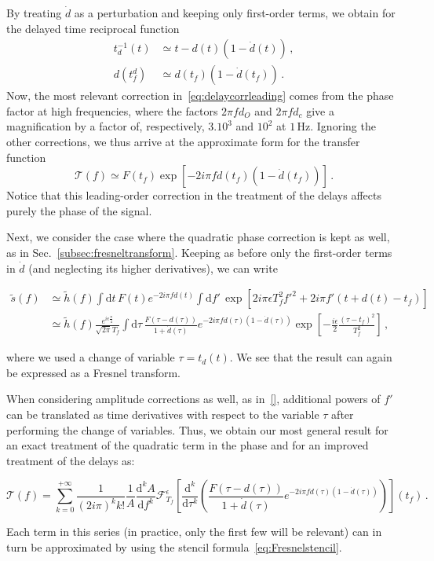 \documentclass[aps,showpacs,twocolumn,
prd,superscriptaddress,nofootinbib]{revtex4-1}
\newcommand{\be}{\begin{equation}}
\newcommand{\ee}{\end{equation}}
\newcommand\ud{{\mathrm{d}}}
\newcommand\calF{{\mathcal{F}}}
\newcommand\calT{{\mathcal{T}}}
\newcommand{\nn}{\nonumber}
\newcommand{\Hz}{\,\mathrm{Hz}}
\newcommand{\tf}{t_{f}}
\newcommand{\Tf}{T_{f}}
\begin{document}
By treating $\dot{d}$ as a perturbation and keeping only first-order terms, we obtain for the delayed time reciprocal function
\begin{align}
	t_{d}^{-1}(t) &\simeq t-d(t) (1-\dot{d}(t)) \,,\nn\\
	d(t_{f}^{d}) &\simeq d(t_{f}) ( 1 - \dot{d}(t_{f})) \,.
\end{align}
Now, the most relevant correction in~\eqref{eq:delaycorrleading} comes from the phase factor at high frequencies, where the factors $2\pi f d_{O}$ and $2\pi f d_{c}$ give a magnification by a factor of, respectively, $3.10^{3}$ and $10^{2}$ at $1\Hz$. Ignoring the other corrections, we thus arrive at the approximate form for the transfer function
\be
	\calT(f) \simeq F(t_{f})\exp\left[ -2i\pi f d(t_{f}) (1-\dot{d}(t_{f})) \right] \,.
\ee
Notice that this leading-order correction in the treatment of the delays affects purely the phase of the signal.

Next, we consider the case where the quadratic phase correction is kept as well, as in Sec.~\ref{subsec:fresneltransform}. Keeping as before only the first-order terms in $\dot{d}$ (and neglecting its higher derivatives), we can write
\begin{widetext}
\begin{align}
	\tilde{s}(f) &\simeq \tilde{h}(f) \int \ud t \, F(t) e^{-2i\pi f d(t)} \int \ud f' \, \exp\left[ 2i\pi \epsilon \Tf^{2} f'^{2} + 2i\pi f' (t+d(t) - \tf) \right] \nn\\
	&\simeq \tilde{h}(f) \frac{e^{i\epsilon\frac{\pi}{4}}}{\sqrt{2\pi}\Tf} \int \ud \tau \, \frac{F(\tau - d(\tau))}{1+\dot{d}(\tau)} e^{-2i\pi f d(\tau)(1-\dot{d}(\tau))}\exp\left[ -\frac{i\epsilon}{2} \frac{(\tau - \tf)^{2}}{\Tf^{2}} \right] \,,
\end{align}
\end{widetext}
where we used a change of variable $\tau = t_{d}(t)$. We see that the result can again be expressed as a Fresnel transform.

When considering amplitude corrections as well, as in~\eqref{}, additional powers of $f'$ can be translated as time derivatives with respect to the variable $\tau$ after performing the change of variables. Thus, we obtain our most general result for an exact treatment of the quadratic term in the phase and for an improved treatment of the delays as:
\begin{widetext}
\be\label{eq:transferfinal}
	\calT(f) = \sum\limits_{k=0}^{+\infty} \frac{1}{(2i\pi)^{k} k!} \frac{1}{A} \frac{\ud^{k}A}{\ud f^{k}}  \calF^{\epsilon}_{\Tf} \left[ \frac{\ud^{k}}{\ud \tau^{k}} \left( \frac{F(\tau - d(\tau))}{1+\dot{d}(\tau)} e^{-2i\pi f d(\tau)(1-\dot{d}(\tau))} \right) \right] (\tf) \,.
\ee
\end{widetext}
Each term in this series (in practice, only the first few will be relevant) can in turn be approximated by using the stencil formula~\eqref{eq:Fresnelstencil}.
\end{document}
